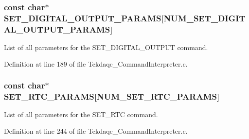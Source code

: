 \hypertarget{group__command__interpreter_gade511743b3ecf569a2e74c1b14291a5b}{
\subsubsection[{S\-E\-T\-\_\-\-D\-I\-G\-I\-T\-A\-L\-\_\-\-O\-U\-T\-P\-U\-T\-\_\-\-P\-A\-R\-A\-M\-S}]{\setlength{\rightskip}{0pt plus 5cm}const char$\ast$ S\-E\-T\-\_\-\-D\-I\-G\-I\-T\-A\-L\-\_\-\-O\-U\-T\-P\-U\-T\-\_\-\-P\-A\-R\-A\-M\-S\mbox{[}{\bf N\-U\-M\-\_\-\-S\-E\-T\-\_\-\-D\-I\-G\-I\-T\-A\-L\-\_\-\-O\-U\-T\-P\-U\-T\-\_\-\-P\-A\-R\-A\-M\-S}\mbox{]}}}\label{group__command__interpreter_gade511743b3ecf569a2e74c1b14291a5b}
List of all parameters for the S\-E\-T\-\_\-\-D\-I\-G\-I\-T\-A\-L\-\_\-\-O\-U\-T\-P\-U\-T command. 

Definition at line 189 of file Tekdaqc\-\_\-\-Command\-Interpreter.\-c.

\hypertarget{group__command__interpreter_ga37a6030d18afb1719e8b674ac3e649ec}{
\subsubsection[{S\-E\-T\-\_\-\-R\-T\-C\-\_\-\-P\-A\-R\-A\-M\-S}]{\setlength{\rightskip}{0pt plus 5cm}const char$\ast$ S\-E\-T\-\_\-\-R\-T\-C\-\_\-\-P\-A\-R\-A\-M\-S\mbox{[}{\bf N\-U\-M\-\_\-\-S\-E\-T\-\_\-\-R\-T\-C\-\_\-\-P\-A\-R\-A\-M\-S}\mbox{]}}}\label{group__command__interpreter_ga37a6030d18afb1719e8b674ac3e649ec}
List of all parameters for the S\-E\-T\-\_\-\-R\-T\-C command. 

Definition at line 244 of file Tekdaqc\-\_\-\-Command\-Interpreter.\-c.

